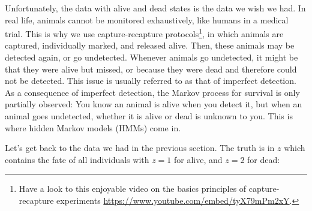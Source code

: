 \documentclass[
  12pt,
]{krantz}
\makeatletter
\newenvironment{kframe}{%
\medskip{}
\setlength{\fboxsep}{.8em}
 \def\at@end@of@kframe{}%
 \ifinner\ifhmode%
  \def\at@end@of@kframe{\end{minipage}}%
  \begin{minipage}{\columnwidth}%
 \fi\fi%
 \def\FrameCommand##1{\hskip\@totalleftmargin \hskip-\fboxsep
 \colorbox{shadecolor}{##1}\hskip-\fboxsep
     \hskip-\linewidth \hskip-\@totalleftmargin \hskip\columnwidth}%
 \MakeFramed {\advance\hsize-\width
   \@totalleftmargin\z@ \linewidth\hsize
   \@setminipage}}%
 {\par\unskip\endMakeFramed%
 \at@end@of@kframe}
\newenvironment{rmdblock}[1]
  {
  \begin{itemize}
  \renewcommand{\labelitemi}{
    \raisebox{-.7\height}[0pt][0pt]{
      {\setkeys{Gin}{width=3em,keepaspectratio}\texttt{[image: images/\#1]}}
    }
  }
  \setlength{\fboxsep}{1em}
  \begin{kframe}
  \item
  }
  {
  \end{kframe}
  \end{itemize}
  }
\newenvironment{rmdnote}
  {\begin{rmdblock}{note}}
  {\end{rmdblock}}
\makeatother
\begin{document}
\begin{rmdnote}
Unfortunately, the data with alive and dead states is the data we wish we had. In real life, animals cannot be monitored exhaustively, like humans in a medical trial. This is why we use capture-recapture protocols\footnote{Have a look to this enjoyable video on the basics principles of capture-recapture experiments \url{https://www.youtube.com/embed/tyX79mPm2xY}.}, in which animals are captured, individually marked, and released alive. Then, these animals may be detected again, or go undetected. Whenever animals go undetected, it might be that they were alive but missed, or because they were dead and therefore could not be detected. This issue is usually referred to as that of imperfect detection. As a consequence of imperfect detection, the Markov process for survival is only partially observed: You know an animal is alive when you detect it, but when an animal goes undetected, whether it is alive or dead is unknown to you. This is where hidden Markov models (HMMs) come in.
\end{rmdnote}

Let's get back to the data we had in the previous section. The truth is in \(z\) which contains the fate of all individuals with \(z = 1\) for alive, and \(z = 2\) for dead:
\end{document}
